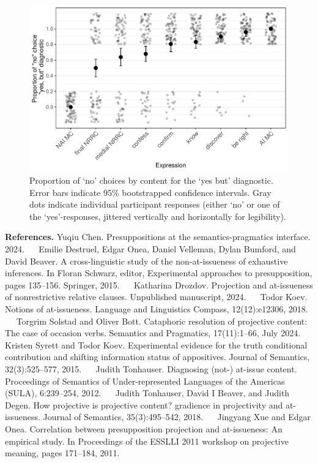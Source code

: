 \documentclass[11pt, a4paper]{article}
\begin{document}
\begin{figure}[htbp]
\vspace{-2\baselineskip}
  \caption{Proportion of ‘no’ choices by content for the `yes but' diagnostic. Error bars indicate 95\% bootstrapped confidence intervals. Gray dots indicate individual participant responses (either ‘no’ or one of the ‘yes’-responses, jittered vertically and horizontally for legibility).} \label{fig:yb}
  \vspace{-.5\baselineskip}
  \centering
  \includegraphics[width=.48\textwidth]{img/YB.pdf}
\end{figure}

\vspace{-.8\baselineskip}
\noindent \textbf{References.}
Yuqiu Chen. Presuppositions at the semantics-pragmatics interface. 2024.
 ~\textbullet~
%
Emilie Destruel, Edgar Onea, Daniel Velleman, Dylan Bumford, and David Beaver. A cross-linguistic study of the non-at-issueness of exhaustive inferences. In Floran Schwarz, editor, Experimental approaches to presupposition,
pages 135–156. Springer, 2015. ~\textbullet~
%
Katharina Drozdov. Projection and at-issueness of nonrestrictive relative clauses. Unpublished manuscript, 2024.
 ~\textbullet~
%
Todor Koev. Notions of at-issueness. Language and Linguistics Compass, 12(12):e12306, 2018.
 ~\textbullet~
%
Torgrim Solstad and Oliver Bott. Cataphoric resolution of projective content: The case of occasion verbs. Semantics and Pragmatics, 17(11):1–66, July 2024.
 ~\textbullet~
%
Kristen Syrett and Todor Koev. Experimental evidence for the truth conditional contribution and shifting information status of appositives. Journal of Semantics, 32(3):525–577, 2015.
 ~\textbullet~
%
Judith Tonhauser. Diagnosing (not-) at-issue content. Proceedings of Semantics of Under-represented Languages of the Americas (SULA), 6:239–254, 2012.
 ~\textbullet~
%
Judith Tonhauser, David I Beaver, and Judith Degen. How projective is projective content? gradience in projectivity and at-issueness. Journal of Semantics, 35(3):495–542, 2018.
 ~\textbullet~
%
Jingyang Xue and Edgar Onea. Correlation between presupposition projection and at-issueness: An empirical study.
In Proceedings of the ESSLLI 2011 workshop on projective meaning, pages 171–184, 2011.


\pagebreak


\end{document}
